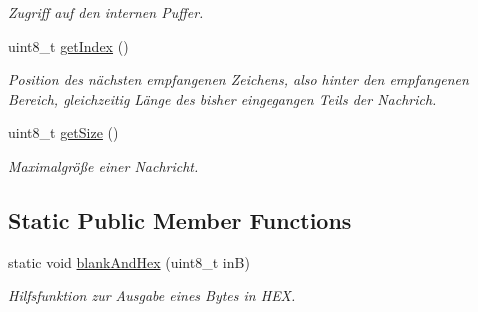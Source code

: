 \begin{DoxyCompactItemize}
\begin{DoxyCompactList}\small\item\em Zugriff auf den internen Puffer. \end{DoxyCompactList}\item 
uint8\+\_\+t \hyperlink{class_s_serial_af905db964544b6acc41b6214f59b494b}{get\+Index} ()
\begin{DoxyCompactList}\small\item\em Position des nächsten empfangenen Zeichens, also hinter den empfangenen Bereich, gleichzeitig Länge des bisher eingegangen Teils der Nachrich. \end{DoxyCompactList}\item 
uint8\+\_\+t \hyperlink{class_s_serial_a1b6055bcc85e4ab6a9022ea696da81fe}{get\+Size} ()
\begin{DoxyCompactList}\small\item\em Maximalgröße einer Nachricht. \end{DoxyCompactList}\end{DoxyCompactItemize}
\subsection*{Static Public Member Functions}
\begin{DoxyCompactItemize}
\item 
static void \hyperlink{class_s_serial_a25d8d6940a777f1ee9025d84686427f4}{blank\+And\+Hex} (uint8\+\_\+t inB)
\begin{DoxyCompactList}\small\item\em Hilfsfunktion zur Ausgabe eines Bytes in H\+EX. \end{DoxyCompactList}\end{DoxyCompactItemize}
